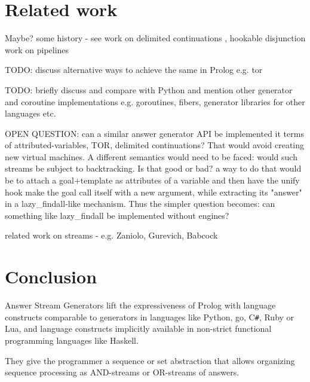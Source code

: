 \documentclass{new_tlp}
\begin{document}
\EI



\section{Related work}

\vskip 1cm
Maybe?
\BI 
\I some history - see
\cite{tarau:parimp99,tarau:cl2000,iclp08:inter,ciclops08:pINTER}
\cite{coord11tarau}
\cite{bp2011}
\I work on delimited continuations \cite{delim}, hookable disjunction \cite{tor}
\I work on pipelines \cite{pipelines}
\EI


{\Large TODO: discuss alternative ways to achieve the same in Prolog e.g. tor \cite{tor}}

{\Large TODO: briefly discuss and compare with Python and mention other generator and coroutine implementations e.g. goroutines, fibers, generator libraries for other languages etc.}

{\Large OPEN QUESTION: can a similar answer generator API be implemented
it terms of  attributed-variables, TOR, delimited continuations? That 
would avoid creating new virtual machines. A different semantics would need to
be faced: would such streams be subject to backtracking. Is that good or bad? 
} a way to do that would be to attach a goal+template as attributes of a variable
and then have the unify hook make the goal call itself with a new argument, while
extracting its "answer" in a lazy\_findall-like mechanism. Thus the simpler question becomes:
{\large can something like lazy\_findall be implemented without engines?}

{\Large related work on streams - e.g. Zaniolo, Gurevich,  Babcock}

\section{Conclusion}

Answer Stream Generators lift the expressiveness of Prolog with language constructs comparable to generators in languages like Python, go, C\verb~#~, Ruby or Lua, and language constructs implicitly available in non-strict functional programming languages like Haskell. 

They give the programmer a sequence or set abstraction that allows organizing sequence processing as AND-streams or OR-streams of answers.
\end{document}
